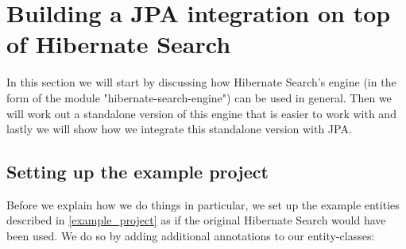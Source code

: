 \section{Building a JPA integration on top of Hibernate Search}

In this section we will start by discussing how Hibernate Search's engine (in the form of the module "hibernate-search-engine") can be used in general. Then we will work out a standalone version of this engine that is easier to work with and lastly we will show how we integrate this standalone version with JPA.

\subsection{Setting up the example project}

Before we explain how we do things in particular, we set up the example entities described in \ref{example_project} as if the original Hibernate Search would have been used. We do so by adding additional annotations to our entity-classes:

